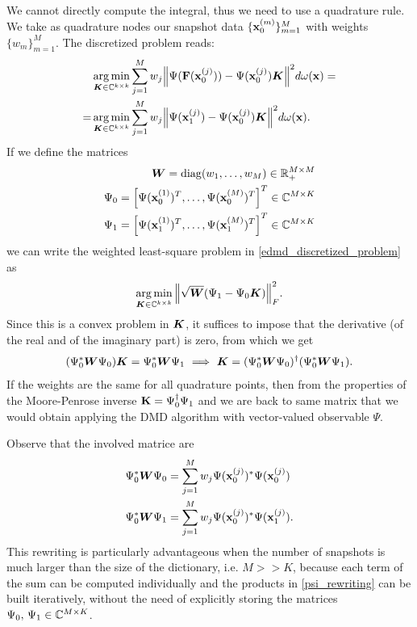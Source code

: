 We cannot directly compute the integral, thus we need to use a quadrature rule. We take as quadrature nodes our snapshot data $\{\vb{x}_0^{(m)}\}_{m = 1}^M$ with weights $\{w_m\}_{m = 1}^M$. The discretized problem reads:
\begin{equation}
\label{edmd_discretized_problem}
\begin{split}
    &\operatorname*{arg\,min}_{\vb*{K}\in\mathbb{C}^{k\times k}} \sum_{j=1}^M w_j \norm{\Psi(\vb{F}(\vb{x}_0^{(j)})) - \Psi(\vb{x}_0^{(j)})\vb*{K}}^2 d\omega(\vb{x}) = \\
    = &\operatorname*{arg\,min}_{\vb*{K}\in\mathbb{C}^{k\times k}} \sum_{j=1}^M w_j \norm{\Psi(\vb{x}_1^{(j)}) - \Psi(\vb{x}_0^{(j)})\vb*{K}}^2 d\omega(\vb{x}).
\end{split}    
\end{equation}
If we define the matrices
\begin{align}
\label{w_def}
\vb*{W} = \mathrm{diag}(w_1,\dots,w_M)\in\mathbb{R}_+^{M\times M} \\
\label{psi0_def}
\Psi_0 = \left[\Psi(\vb{x}_0^{(1)})^T,\dots,\Psi(\vb{x}_0^{(M)})^T\right]^T\in\mathbb{C}^{M\times K} \\
\label{psi1_def}
\Psi_1 = \left[\Psi(\vb{x}_1^{(1)})^T,\dots,\Psi(\vb{x}_1^{(M)})^T\right]^T\in\mathbb{C}^{M\times K}
\end{align}
we can write the weighted least-square problem in \eqref{edmd_discretized_problem} as 
\begin{equation}
    \label{edmd_discretized_problem_matrix}
    \operatorname*{arg\,min}_{\vb*{K}\in\mathbb{C}^{k\times k}}\norm{\sqrt{\vb*{W}}(\Psi_1 - \Psi_0\vb*{K})}_F^2.
\end{equation}
Since this is a convex problem in $\vb*{K}$, it suffices to impose that the derivative (of the real and of the imaginary part) is zero, from which we get
\begin{equation}
    \label{discretized_problem_solution}
    (\Psi_0^*\vb*{W}\Psi_0)\vb*{K} = \Psi_0^*\vb*{W}\Psi_1 \,\,\Longrightarrow\,\, \vb*{K} = (\Psi_0^*\vb*{W}\Psi_0)^{\dagger}(\Psi_0^*\vb*{W}\Psi_1).
\end{equation}
If the weights are the same for all quadrature points, then from the properties of the Moore-Penrose inverse $\vb{K} = \Psi_0^{\dagger} \Psi_1$ and we are back to same matrix that we would obtain applying the DMD algorithm with vector-valued observable $\Psi$.

Observe that the involved matrice are
\begin{equation*}
    \label{psi_rewriting}
    \begin{split}
        \Psi_0^*\vb*{W}\Psi_0 & = \sum_{j=1}^M w_j \Psi(\vb{x}_0^{(j)})^* \Psi(\vb{x}_0^{(j)})\\
        \Psi_0^*\vb*{W}\Psi_1 & = \sum_{j=1}^M w_j \Psi(\vb{x}_0^{(j)})^* \Psi(\vb{x}_1^{(j)}).
    \end{split}
\end{equation*}
This rewriting is particularly advantageous when the number of snapshots is much larger than the size of the dictionary, i.e. $M >> K$, because each term of the sum can be computed individually and the products in \eqref{psi_rewriting} can be built iteratively, without the need of explicitly storing the matrices $\Psi_0,\,\Psi_1\in\mathbb{C}^{M\times K}$.

